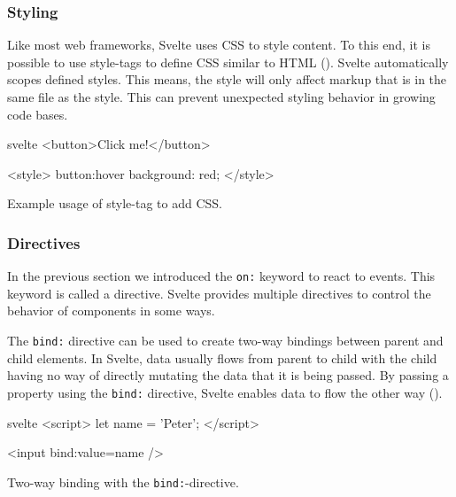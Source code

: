 \subsubsection{Styling}
\label{sec:svelte-styling}
Like most web frameworks, Svelte uses CSS to style content. To this end, it is possible to use style-tags to define CSS similar to HTML (). Svelte automatically scopes defined styles. This means, the style will only affect markup that is in the same file as the style. This can prevent unexpected styling behavior in growing code bases. 

\begin{listing}[H]
\begin{myminted}{svelte}{}
<button>Click me!</button>

<style>
  button:hover {
    background: red;
  }
</style>
\end{myminted}
\caption{Example usage of style-tag to add CSS.}
\label{fig:svelte-style-tag}
\end{listing}

\subsubsection{Directives}
\label{sec:svelte-directives}
In the previous section we introduced the \texttt{on:} keyword to react to events. This keyword is called a directive. Svelte provides multiple directives to control the behavior of components in some ways.

The \texttt{bind:} directive can be used to create two-way bindings between parent and child elements. In Svelte, data usually flows from parent to child with the child having no way of directly mutating the data that it is being passed. By passing a property using the \texttt{bind:} directive, Svelte enables data to flow the other way ().

\begin{listing}[H]
\begin{myminted}{svelte}{}
<script>
  let name = 'Peter';
</script>

<input bind:value={name} />
\end{myminted}
\caption{Two-way binding with the \texttt{bind:}-directive.}
\label{fig:svelte-bind-directive}
\end{listing}

